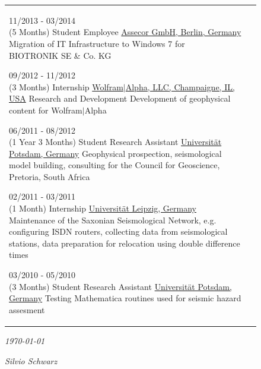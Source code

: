 \documentclass{scrartcl}
\newcommand{\entry}[4]{%
  \parbox[t]{3cm}{#1}&\parbox[t]{10cm}{%
    \textbf{#2}%
    \hfill%
    {\footnotesize \color{pblue} #3}\\%
    #4\\ \vspace{\parsep}%
  }\\}
\begin{document}
\begin{figure}[htb]
\begin{minipage}[t]{0.72\textwidth}
\begin{tabular*}{\textwidth}{@{\extracolsep{\fill}}ll}
	    \entry
	    {11/2013 - 03/2014 \\ (5 Months)}
	    {Student Employee}
	    {\href{https://assecor.de/}{Assecor GmbH, Berlin, Germany}}
	    {Migration of IT Infrastructure to Windows 7 for\\
	     BIOTRONIK SE \& Co. KG}
	    
	    \entry
	    {09/2012 - 11/2012 \\ (3 Months)}
	    {Internship}
	    {\href{https:///www.wolframalpha.com/}{Wolfram$\mid$Alpha, LLC, Champaigne, IL, USA}}
	    {Research and Development\\
	    Development of geophysical content for Wolfram$\mid$Alpha}
	    
	    \entry
	    {06/2011 - 08/2012 \\ (1 Year 3 Months)}
	    {Student Research Assistant}
	    {\href{https://www.uni-potsdam.de/}{Universität Potsdam, Germany}}
	    {Geophysical prospection, seismological model building, consulting for the Council for Geoscience, Pretoria, South Africa}
	    
	    \entry
	    {02/2011 - 03/2011 \\ (1 Month)}
	    {Internship} 
	    {\href{https://www.zv.uni-leipzig.de/}{Universität Leipzig, Germany}}
	    {Maintenance of the Saxonian Seismological Network, e.g. configuring ISDN routers, collecting data from seismological stations, data preparation for relocation using double difference times}
	    
	    \entry
	    {03/2010 - 05/2010 \\ (3 Months)}
	    {Student Research Assistant}
	    {\href{https://www.uni-potsdam.de/}{Universität Potsdam, Germany}}
	    {Testing Mathematica routines used for seismic hazard assesment}
	    
	    \end{tabular*}	
	    \vspace{2cm}
\begin{flushleft}
\emph{\today}
\end{flushleft}
\begin{flushright}
\emph{Silvio Schwarz}
\end{flushright}
	\end{minipage}
\end{figure}
\end{document}
